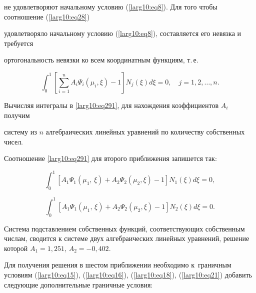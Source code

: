 не удовлетворяют начальному условию (\ref{larg10:eq8}). Для того чтобы соотношение (\ref{larg10:eq28})

удовлетворяло начальному условию (\ref{larg10:eq8}), составляется его невязка и требуется

ортогональность невязки ко всем координатным функциям, т.\,е.

\begin{equation}

\label{larg10:eq291}

\int _0^1 \left[ \sum \limits_{i=1}^n A_i \Psi _i (\mu_i, \xi)-1 \right] N_j (\xi ) d\xi =0, \quad j=1, 2, \dots, n.

\end{equation}



Вычисляя интегралы в \eqref{larg10:eq291}, для нахождения коэффициентов $A_i$ получим

систему из $n$ алгебраических линейных уравнений по количеству собственных чисел.



Соотношение \eqref{larg10:eq291} для второго приближения запишется так:

$$

\int_0^1 \left[ A_1 \Psi _1 (\mu_1,\,\xi ) + A_2 \Psi _2 (\mu_2

,\xi)-1 \right] N_1 (\xi )d\xi =0, 

$$

$$

\int_0^1 \left[ A_1 \Psi _1 (\mu _1,\,\xi ) + A_2 \Psi_2 (\mu_2

,\xi)-1 \right] N_2 (\xi )d\xi =0.

$$

Система подставлением собственных функций, соответствующих собственным числам,  сводится к системе двух алгебраических линейных уравнений, решение которой $A_1 =1,251$, $A_2 =- 0,402$.





Для получения решения в шестом приближении необходимо  к~граничным условиям (\ref{larg10:eq15}), (\ref{larg10:eq16}), (\ref{larg10:eq18}), (\ref{larg10:eq21}) добавить следующие дополнительные граничные условия:

